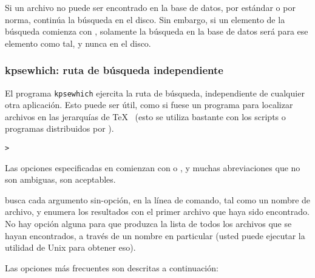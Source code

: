 \documentclass{article}
\begin{document}
Si un archivo no puede ser encontrado en la base de datos, \KPS{} por
estándar o por norma, continúa la búsqueda en el disco. Sin embargo,
si un elemento de la búsqueda comienza con \samp{!!}, solamente la
búsqueda en la base de datos será para ese elemento como tal, y nunca
en el disco. 

\subsubsection{kpsewhich: ruta de búsqueda independiente}
\label{sec:invoking-kpsewhich}

El programa \texttt{kpsewhich} ejercita la ruta de búsqueda,
independiente de cualquier otra aplicación. Esto puede ser útil, como si
fuese un programa  para localizar archivos en las
jerarquías de \TeX{} ~(esto se utiliza bastante con los scripts o programas
distribuidos por ).

\begin{alltt}
> 
\end{alltt}
Las opciones especificadas en  comienzan con \samp{-} o
\samp{-{}-}, y muchas abreviaciones que no son ambiguas, son
aceptables.

\KPS{} busca cada argumento sin-opción, en la línea de comando, tal como
un nombre de archivo, y enumera los resultados con el primer archivo
que haya sido encontrado. No hay opción alguna para que produzca la lista de
todos los archivos que se hayan encontrados, a través de un nombre en
particular (usted puede ejecutar la utilidad de Unix  para
obtener eso).

Las opciones más frecuentes son descritas a continuación:
\end{document}
